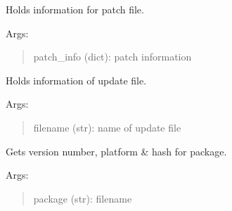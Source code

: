 \documentclass[letterpaper,10pt,english]{sphinxmanual}
\begin{document}
\label{api:module-pyi_updater.package_handler.package}

\begin{fulllineitems}
\label{api:pyi_updater.package_handler.package.Patch}
Holds information for patch file.

Args:
\begin{quote}

patch\_info (dict): patch information
\end{quote}

\end{fulllineitems}


\begin{fulllineitems}
\label{api:pyi_updater.package_handler.package.Package}
Holds information of update file.

Args:
\begin{quote}

filename (str): name of update file
\end{quote}

\begin{fulllineitems}
\label{api:pyi_updater.package_handler.package.Package.extract_info}
Gets version number, platform \& hash for package.

Args:
\begin{quote}

package (str): filename
\end{quote}

\end{fulllineitems}


\end{fulllineitems}

\label{api:module-pyi_updater.patcher}
\end{document}
